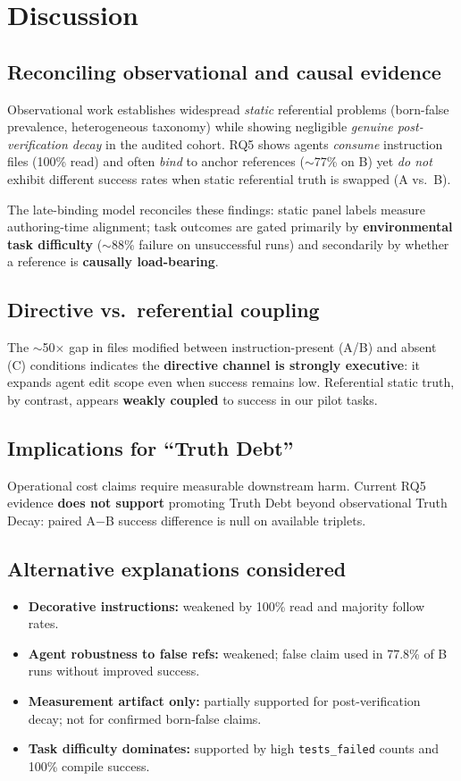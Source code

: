 \section{Discussion}
\label{sec:discussion}

\subsection{Reconciling observational and causal evidence}
Observational work establishes widespread \emph{static} referential problems (born-false prevalence, heterogeneous taxonomy) while showing negligible \emph{genuine post-verification decay} in the audited cohort.
RQ5 shows agents \emph{consume} instruction files (100\% read) and often \emph{bind} to anchor references ($\sim$77\% on B) yet \emph{do not} exhibit different success rates when static referential truth is swapped (A vs.\ B).

The late-binding model reconciles these findings:
static panel labels measure authoring-time alignment; task outcomes are gated primarily by \textbf{environmental task difficulty} ($\sim$88\% failure on unsuccessful runs) and secondarily by whether a reference is \textbf{causally load-bearing}.

\subsection{Directive vs.\ referential coupling}
The $\sim$50$\times$ gap in files modified between instruction-present (A/B) and absent (C) conditions indicates the \textbf{directive channel is strongly executive}: it expands agent edit scope even when success remains low.
Referential static truth, by contrast, appears \textbf{weakly coupled} to success in our pilot tasks.

\subsection{Implications for ``Truth Debt''}
Operational cost claims require measurable downstream harm.
Current RQ5 evidence \textbf{does not support} promoting Truth Debt beyond observational Truth Decay: paired A$-$B success difference is null on available triplets.

\subsection{Alternative explanations considered}
\begin{itemize}
  \item \textbf{Decorative instructions:} weakened by 100\% read and majority follow rates.
  \item \textbf{Agent robustness to false refs:} weakened; false claim used in 77.8\% of B runs without improved success.
  \item \textbf{Measurement artifact only:} partially supported for post-verification decay; not for confirmed born-false claims.
  \item \textbf{Task difficulty dominates:} supported by high \texttt{tests\_failed} counts and 100\% compile success.
\end{itemize}

